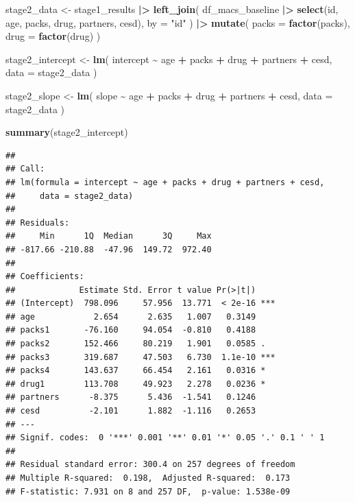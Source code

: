 \documentclass[
]{article}
\newenvironment{Shaded}{\begin{snugshade}}{\end{snugshade}}
\newcommand{\AttributeTok}[1]{\textcolor[rgb]{0.13,0.29,0.53}{#1}}
\newcommand{\FunctionTok}[1]{\textcolor[rgb]{0.13,0.29,0.53}{\textbf{#1}}}
\newcommand{\NormalTok}[1]{#1}
\newcommand{\OtherTok}[1]{\textcolor[rgb]{0.56,0.35,0.01}{#1}}
\newcommand{\SpecialCharTok}[1]{\textcolor[rgb]{0.81,0.36,0.00}{\textbf{#1}}}
\newcommand{\StringTok}[1]{\textcolor[rgb]{0.31,0.60,0.02}{#1}}
\begin{document}
\begin{Shaded}
\begin{Highlighting}[]
\NormalTok{stage2\_data }\OtherTok{\textless{}{-}}\NormalTok{ stage1\_results }\SpecialCharTok{|\textgreater{}}
  \FunctionTok{left\_join}\NormalTok{(}
\NormalTok{    df\_macs\_baseline }\SpecialCharTok{|\textgreater{}}
      \FunctionTok{select}\NormalTok{(id, age, packs, drug, partners, cesd),}
    \AttributeTok{by =} \StringTok{"id"}
\NormalTok{  ) }\SpecialCharTok{|\textgreater{}}
  \FunctionTok{mutate}\NormalTok{(}
    \AttributeTok{packs =} \FunctionTok{factor}\NormalTok{(packs),}
    \AttributeTok{drug =} \FunctionTok{factor}\NormalTok{(drug)}
\NormalTok{  )}

\NormalTok{stage2\_intercept }\OtherTok{\textless{}{-}} \FunctionTok{lm}\NormalTok{(}
\NormalTok{  intercept }\SpecialCharTok{\textasciitilde{}}\NormalTok{ age }\SpecialCharTok{+}\NormalTok{ packs }\SpecialCharTok{+}\NormalTok{ drug }\SpecialCharTok{+}\NormalTok{ partners }\SpecialCharTok{+}\NormalTok{ cesd,}
  \AttributeTok{data =}\NormalTok{ stage2\_data}
\NormalTok{)}

\NormalTok{stage2\_slope }\OtherTok{\textless{}{-}} \FunctionTok{lm}\NormalTok{(}
\NormalTok{  slope }\SpecialCharTok{\textasciitilde{}}\NormalTok{ age }\SpecialCharTok{+}\NormalTok{ packs }\SpecialCharTok{+}\NormalTok{ drug }\SpecialCharTok{+}\NormalTok{ partners }\SpecialCharTok{+}\NormalTok{ cesd,}
  \AttributeTok{data =}\NormalTok{ stage2\_data}
\NormalTok{)}

\FunctionTok{summary}\NormalTok{(stage2\_intercept)}
\end{Highlighting}
\end{Shaded}

\begin{verbatim}
## 
## Call:
## lm(formula = intercept ~ age + packs + drug + partners + cesd, 
##     data = stage2_data)
## 
## Residuals:
##     Min      1Q  Median      3Q     Max 
## -817.66 -210.88  -47.96  149.72  972.40 
## 
## Coefficients:
##             Estimate Std. Error t value Pr(>|t|)    
## (Intercept)  798.096     57.956  13.771  < 2e-16 ***
## age            2.654      2.635   1.007   0.3149    
## packs1       -76.160     94.054  -0.810   0.4188    
## packs2       152.466     80.219   1.901   0.0585 .  
## packs3       319.687     47.503   6.730  1.1e-10 ***
## packs4       143.637     66.454   2.161   0.0316 *  
## drug1        113.708     49.923   2.278   0.0236 *  
## partners      -8.375      5.436  -1.541   0.1246    
## cesd          -2.101      1.882  -1.116   0.2653    
## ---
## Signif. codes:  0 '***' 0.001 '**' 0.01 '*' 0.05 '.' 0.1 ' ' 1
## 
## Residual standard error: 300.4 on 257 degrees of freedom
## Multiple R-squared:  0.198,  Adjusted R-squared:  0.173 
## F-statistic: 7.931 on 8 and 257 DF,  p-value: 1.538e-09
\end{verbatim}
\end{document}
